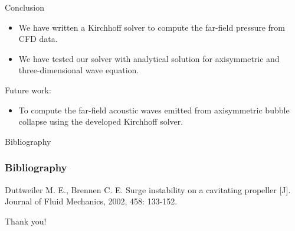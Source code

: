 \documentclass[10pt, aspectratio=169]{beamer}
\begin{document}
\begin{frame}{Conclusion}
	\begin{itemize}
		\item We have written a Kirchhoff solver to compute the far-field pressure from CFD data.
		\item We have tested our solver with analytical solution for axisymmetric and three-dimensional wave equation.
	\end{itemize}
	Future work:
	\begin{itemize}
		\item To compute the far-field acoustic waves emitted from axisymmetric bubble collapse
			  using the developed Kirchhoff solver. 
	\end{itemize}
\end{frame}

\begin{frame}[allowframebreaks]{Bibliography}
	\frametitle{Bibliography}
	
	\begin{thebibliography}{99}
		 Duttweiler M. E., Brennen C. E. Surge instability on a cavitating propeller [J]. Journal of Fluid Mechanics, 2002, 458: 133-152.
		
	\end{thebibliography}
\end{frame}

\begin{frame}[standout]
	Thank you!
\end{frame}
\end{document}
